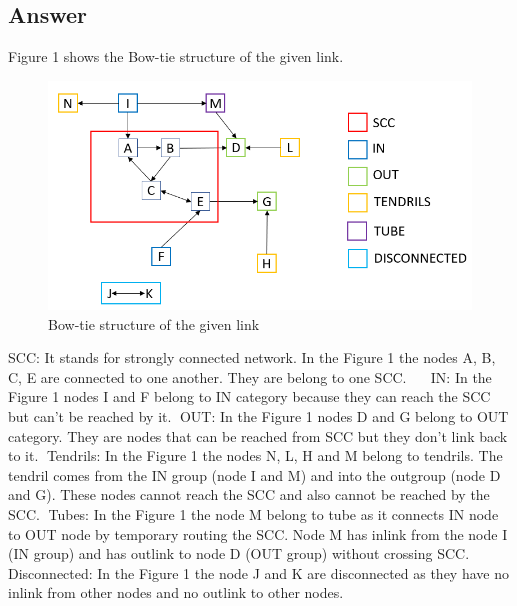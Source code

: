 \documentclass[12pt]{article}
\begin{document}
\subsection*{Answer}


Figure 1 shows the Bow-tie structure of the given link.

\begin{figure}[h]
    \centering
    \includegraphics[trim=0 0 10 8, clip, width=\textwidth] {one1.PNG}
    \caption{Bow-tie structure of the given link}
    \label{fig:web-growth}
\end{figure}
SCC: It stands for strongly connected network.  In the Figure 1 the nodes A, B, C, E are connected to one another. They are belong to one SCC.
\newline
\newline
IN: In the Figure 1 nodes I and F belong to IN category because they can reach the SCC but can’t be reached by it.
\newline
\newline
OUT: In the Figure 1 nodes D and G belong to OUT category. They are nodes that can be reached from SCC but they don't link back to it.
\newline
\newline
Tendrils: In the Figure 1 the nodes  N, L, H  and M belong to tendrils. The tendril comes from the IN group (node I and M) and into the outgroup (node D and G). These nodes cannot reach the SCC and also cannot be reached by the SCC.
\newline
\newline
Tubes: In the Figure 1 the node M belong to tube as it connects IN node to OUT node by temporary routing the SCC. Node M has inlink from the node I (IN group) and has outlink to node D (OUT group) without crossing SCC.
\newline
\newline
Disconnected: In the Figure 1 the node J and K are disconnected as they have no inlink from other nodes and no outlink to other nodes.
\end{document}
